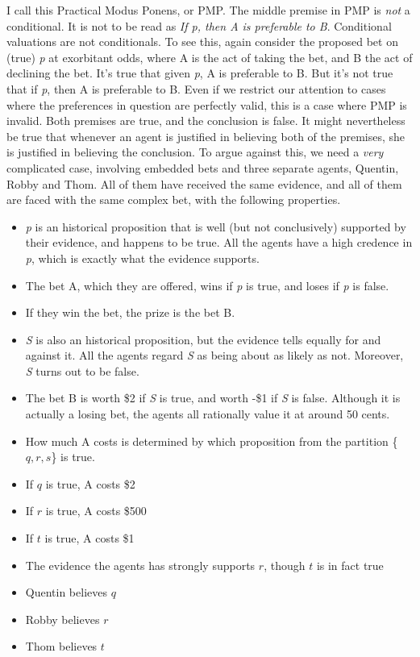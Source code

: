 \documentclass[
  11pt,
  letterpaper,
  DIV=11,
  numbers=noendperiod,
  oneside]{scrartcl}
\begin{document}
I call this Practical Modus Ponens, or PMP. The middle premise in PMP is
\emph{not} a conditional. It is not to be read as \emph{If p, then A is
preferable to B}. Conditional valuations are not conditionals. To see
this, again consider the proposed bet on (true) \emph{p} at exorbitant
odds, where A is the act of taking the bet, and B the act of declining
the bet. It's true that given \emph{p}, A is preferable to B. But it's
not true that if \emph{p}, then A is preferable to B. Even if we
restrict our attention to cases where the preferences in question are
perfectly valid, this is a case where PMP is invalid. Both premises are
true, and the conclusion is false. It might nevertheless be true that
whenever an agent is justified in believing both of the premises, she is
justified in believing the conclusion. To argue against this, we need a
\emph{very} complicated case, involving embedded bets and three separate
agents, Quentin, Robby and Thom. All of them have received the same
evidence, and all of them are faced with the same complex bet, with the
following properties.

\begin{itemize}
\item
  \emph{p} is an historical proposition that is well (but not
  conclusively) supported by their evidence, and happens to be true. All
  the agents have a high credence in \emph{p}, which is exactly what the
  evidence supports.
\item
  The bet A, which they are offered, wins if \emph{p} is true, and loses
  if \emph{p} is false.
\item
  If they win the bet, the prize is the bet B.
\item
  \emph{S} is also an historical proposition, but the evidence tells
  equally for and against it. All the agents regard \emph{S} as being
  about as likely as not. Moreover, \emph{S} turns out to be false.
\item
  The bet B is worth \$2 if \emph{S} is true, and worth -\$1 if \emph{S}
  is false. Although it is actually a losing bet, the agents all
  rationally value it at around 50 cents.
\item
  How much A costs is determined by which proposition from the partition
  \{\(q, r, s\)\} is true.
\item
  If \(q\) is true, A costs \$2
\item
  If \(r\) is true, A costs \$500
\item
  If \(t\) is true, A costs \$1
\item
  The evidence the agents has strongly supports \(r\), though \(t\) is
  in fact true
\item
  Quentin believes \(q\)
\item
  Robby believes \(r\)
\item
  Thom believes \(t\)
\end{itemize}
\end{document}
